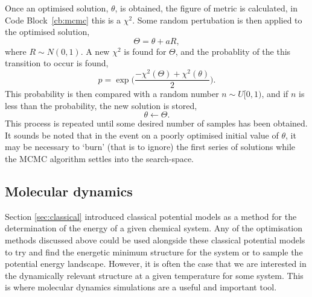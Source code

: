 Once an optimised solution, $\theta$, is obtained, the figure of metric is calculated, in Code Block~\ref{cb:mcmc} this is a $\chi^2$.
Some random pertubation is then applied to the optimised solution,
%
\begin{equation}
\Theta = \theta + aR,
\end{equation}
%
where $R\sim N(0, 1)$.
A new $\chi^2$ is found for $\Theta$, and the probablity of the this transition to occur is found,
%
\begin{equation}
p = \exp{\bigg(\frac{-\chi^2(\Theta) + \chi^2(\theta)}{2}\bigg)}.
\end{equation}
%
This probability is then compared with a random number $n\sim U[0, 1)$, and if $n$ is less than the probability, the new solution is stored,
%
\begin{equation}
\theta \leftarrow \Theta.
\end{equation}
%
This process is repeated until some desired number of samples has been obtained.
It sounds be noted that in the event on a poorly optimised initial value of $\theta$, it may be necessary to `burn' (that is to ignore) the first series of solutions while the MCMC algorithm settles into the search-space.

\subsection{Molecular dynamics}
\label{sec:md}
Section \ref{sec:classical} introduced classical potential models as a method for the determination of the energy of a given chemical system.
Any of the optimisation methods discussed above could be used alongside these classical potential models to try and find the energetic minimum structure for the system or to sample the potential energy landscape.
However, it is often the case that we are interested in the dynamically relevant structure at a given temperature for some system.
This is where molecular dynamics simulations are a useful and important tool.

